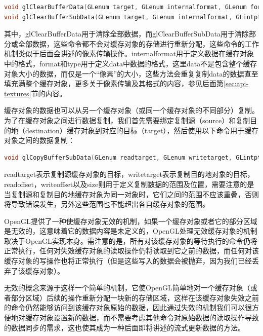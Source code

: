 \begin{lstlisting}[language=C++]
void glClearBufferData​(GLenum target​​, GLenum internalformat​, GLenum format​, GLenum type​, const void * data​);
void glClearBufferSubData​(GLenum target​, GLenum internalformat​, GLintptr offset​, GLsizeiptr size​, GLenum format​, GLenum type​, const void * data​);
\end{lstlisting}

其中，glClearBufferData用于清除全部数据，而glClearBufferSubData用于清除部分或全部数据，这些命令都不会对缓存对象的存储进行重新分配，这些命令的工作机制类似于后面会讲述的像素传输操作。internalformat用于定义数据在缓存对象中的格式，format和type用于定义data中数据的格式，这里data不是包含整个缓存对象大小的数据，而仅是一个“像素”的大小，这些方法会重复复制data的数据直至填充满整个缓存对象，更多关于像素传输及其格式的内容，参见后面第\ref{sec:api-textures}节的内容。
 
缓存对象的数据也可以从另一个缓存对象（或同一个缓存对象的不同部分）复制。为了在缓存对象之间进行数据复制，我们首先需要绑定复制源（source）和复制目的地（destination）缓存对象到对应的目标（target），然后使用以下命令用于缓存对象之间的数据复制：

\begin{lstlisting}[language=C++]
void glCopyBufferSubData​(GLenum readtarget​, GLenum writetarget​, GLintptr readoffset​, GLintptr writeoffset​, GLsizeiptr size​);
\end{lstlisting}

readtarget表示复制源缓存对象的目标，writetarget表示复制目的地对象的目标，readoffset，writeoffset以及size则用于定义复制数据的范围及位置，需要注意的是当复制源和复制目的地缓存对象为同一对象时，它们之间的范围不应该重叠，否则将导致错误发生，另外这些范围也不能超出各自缓存对象的范围。

OpenGL提供了一种使缓存对象无效的机制，如果一个缓存对象或者它的部分区域是无效的，这意味着它的数据内容是未定义的，OpenGL处理无效缓存对象的机制取决于OpenGL实现本身。需注意的是，所有对该缓存对象的等待执行的命令仍将正常执行，任何对失效缓存对象的读取操作仍将读取到它之前的数据，而任何对该缓存对象的写操作也将正常执行（但是这些写入的数据会被抛弃，因为我们已经丢弃了该缓存对象）。

无效的概念来源于这样一个简单的机制，它使OpenGL简单地对一个缓存对象（或者部分区域）后续的操作重新分配一块新的存储区域，这样在该缓存对象失效之前的命令仍然能够访问到该缓存对象原始的数据，因此通过失效的机制我们可以很方便地对缓存对象设置新的数据，而不需要考虑其他命令对原始数据的读取操作导致的数据同步的需求，这也使其成为一种后面即将讲述的流式更新数据的方法。

